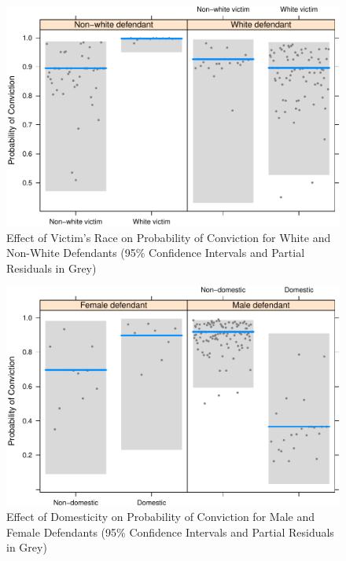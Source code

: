 \documentclass[12pt,article]{article}
\begin{document}
\pagebreak

\begin{figure}[htbp]
\centering
\includegraphics{stand_your_ground_article_files/figure-latex/unnamed-chunk-7.pdf}
\caption{Effect of Victim's Race on Probability of Conviction for White
and Non-White Defendants (95\% Confidence Intervals and Partial
Residuals in Grey)}
\end{figure}

\pagebreak

\begin{figure}[htbp]
\centering
\includegraphics{stand_your_ground_article_files/figure-latex/unnamed-chunk-8.pdf}
\caption{Effect of Domesticity on Probability of Conviction for Male and
Female Defendants (95\% Confidence Intervals and Partial Residuals in
Grey)}
\end{figure}

\pagebreak
\end{document}
